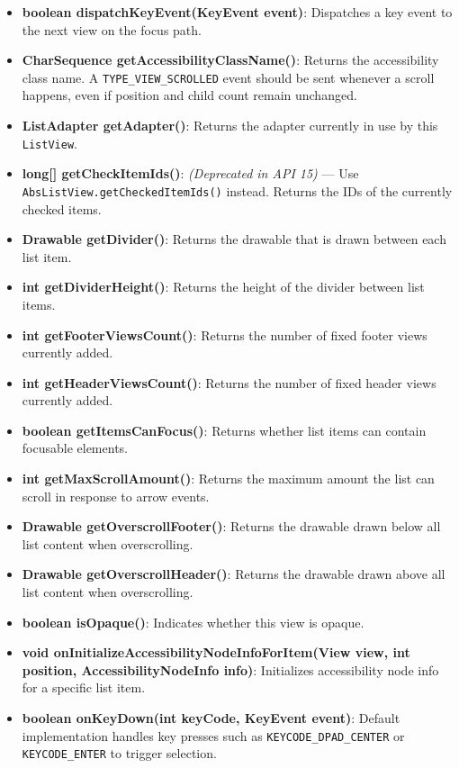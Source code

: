 \documentclass{report}
\begin{document}
\begin{itemize}
\begin{itemize}
                \item \textbf{boolean dispatchKeyEvent(KeyEvent event)}: Dispatches a key event to the next view on the focus path.
                \item \textbf{CharSequence getAccessibilityClassName()}: Returns the accessibility class name. A \texttt{TYPE\_VIEW\_SCROLLED} event should be sent whenever a scroll happens, even if position and child count remain unchanged.
                \item \textbf{ListAdapter getAdapter()}: Returns the adapter currently in use by this \texttt{ListView}.
                \item \textbf{long[] getCheckItemIds()}: \textit{(Deprecated in API 15)} — Use \texttt{AbsListView.getCheckedItemIds()} instead. Returns the IDs of the currently checked items.
                \item \textbf{Drawable getDivider()}: Returns the drawable that is drawn between each list item.
                \item \textbf{int getDividerHeight()}: Returns the height of the divider between list items.
                \item \textbf{int getFooterViewsCount()}: Returns the number of fixed footer views currently added.
                \item \textbf{int getHeaderViewsCount()}: Returns the number of fixed header views currently added.
                \item \textbf{boolean getItemsCanFocus()}: Returns whether list items can contain focusable elements.
                \item \textbf{int getMaxScrollAmount()}: Returns the maximum amount the list can scroll in response to arrow events.
                \item \textbf{Drawable getOverscrollFooter()}: Returns the drawable drawn below all list content when overscrolling.
                \item \textbf{Drawable getOverscrollHeader()}: Returns the drawable drawn above all list content when overscrolling.
                \item \textbf{boolean isOpaque()}: Indicates whether this view is opaque.
                \item \textbf{void onInitializeAccessibilityNodeInfoForItem(View view, int position, AccessibilityNodeInfo info)}: Initializes accessibility node info for a specific list item.
                \item \textbf{boolean onKeyDown(int keyCode, KeyEvent event)}: Default implementation handles key presses such as \texttt{KEYCODE\_DPAD\_CENTER} or \texttt{KEYCODE\_ENTER} to trigger selection.

\end{itemize}
\end{itemize}
\end{document}
